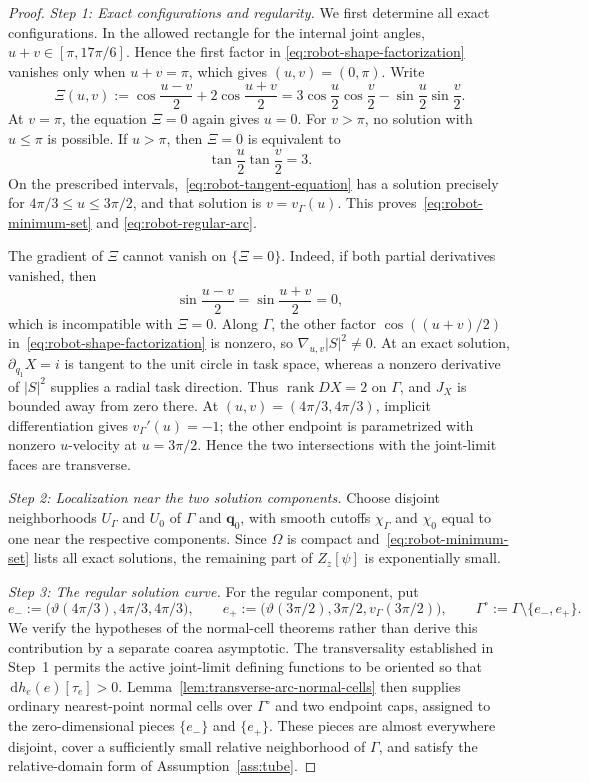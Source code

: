 \documentclass[10pt,a4paper]{amsart}
\DeclareMathOperator{\rank}{rank}
\newcommand{\dd}{\,\mathrm{d}}
\begin{document}
\begin{proof}
\smallskip
\noindent\emph{Step 1: Exact configurations and regularity.}
We first determine all exact configurations.  In the allowed rectangle for
the internal joint angles,
$u+v\in[\pi,17\pi/6]$.  Hence the first factor in
\eqref{eq:robot-shape-factorization} vanishes only when $u+v=\pi$, which gives
$(u,v)=(0,\pi)$.  Write
\[
 \Xi(u,v):=\cos\frac{u-v}{2}+2\cos\frac{u+v}{2}
 =3\cos\frac u2\cos\frac v2-\sin\frac u2\sin\frac v2.
\]
At $v=\pi$, the equation $\Xi=0$ again gives $u=0$.  For $v>\pi$, no solution
with $u\le\pi$ is possible.  If $u>\pi$, then $\Xi=0$ is equivalent to
\begin{equation}\label{eq:robot-tangent-equation}
 \tan\frac u2\tan\frac v2=3.
\end{equation}
On the prescribed intervals,~\eqref{eq:robot-tangent-equation} has a solution
precisely for $4\pi/3\le u\le3\pi/2$, and that solution is
$v=v_\Gamma(u)$.  This proves~\eqref{eq:robot-minimum-set} and
\eqref{eq:robot-regular-arc}.

The gradient of $\Xi$ cannot vanish on $\{\Xi=0\}$.  Indeed, if both partial
derivatives vanished, then
\[
 \sin\frac{u-v}{2}=\sin\frac{u+v}{2}=0,
\]
which is incompatible with $\Xi=0$.  Along $\Gamma$, the other factor
$\cos((u+v)/2)$ in~\eqref{eq:robot-shape-factorization} is nonzero, so
$\nabla_{u,v}|S|^2\ne0$.  At an exact solution,
$\partial_{q_1}X=i$ is tangent to the unit circle in task space, whereas a
nonzero derivative of $|S|^2$ supplies a radial task direction.  Thus
$\rank DX=2$ on $\Gamma$, and $J_X$ is bounded away from zero
there.  At $(u,v)=(4\pi/3,4\pi/3)$, implicit differentiation gives
$v_\Gamma'(u)=-1$; the other endpoint is parametrized with nonzero $u$-velocity at
$u=3\pi/2$.  Hence the two intersections with the joint-limit faces are
transverse.

\smallskip
\noindent\emph{Step 2: Localization near the two solution components.}
Choose disjoint neighborhoods $U_\Gamma$ and $U_0$ of $\Gamma$ and $\bm q_0$,
with smooth cutoffs $\chi_\Gamma$ and $\chi_0$ equal to one near the respective
components.  Since $\Omega$ is compact and~\eqref{eq:robot-minimum-set} lists
all exact solutions, the remaining part of $Z_z[\psi]$ is exponentially
small.

\smallskip
\noindent\emph{Step 3: The regular solution curve.}
For the regular component, put
\[
 e_-:=\bigl(\vartheta(4\pi/3),4\pi/3,4\pi/3\bigr),
 \qquad
 e_+:=\bigl(\vartheta(3\pi/2),3\pi/2,v_\Gamma(3\pi/2)\bigr),
 \qquad
 \Gamma^\circ:=\Gamma\setminus\{e_-,e_+\}.
\]
We verify the hypotheses of the normal-cell theorems rather than derive this
contribution by a separate coarea asymptotic.  The transversality established in
Step~1 permits the active joint-limit defining functions to be oriented so that
$\dd h_e(e)[\tau_e]>0$.  Lemma~\ref{lem:transverse-arc-normal-cells} then supplies
ordinary nearest-point normal cells over $\Gamma^\circ$ and two endpoint caps,
assigned to the zero-dimensional pieces $\{e_-\}$ and $\{e_+\}$.  These pieces
are almost everywhere disjoint, cover a sufficiently small relative
neighborhood of $\Gamma$, and satisfy the relative-domain form of
Assumption~\ref{ass:tube}.


\end{proof}
\end{document}
